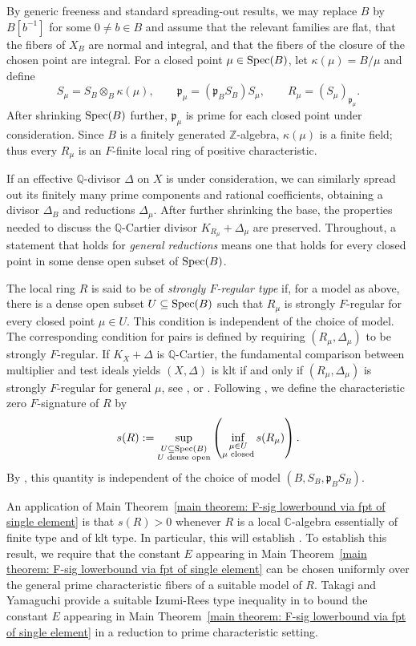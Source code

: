\documentclass[12pt]{amsart}
\numberwithin{equation}{theorem}
\theoremstyle{plain}
\newcommand{\QQ}{\mathbb{Q}}
\newcommand{\CC}{\mathbb{C}}
\begin{document}
By generic freeness and standard spreading-out results, we may replace $B$ by $B[b^{-1}]$ for some $0\ne b\in B$ and assume that the relevant families are flat, that the fibers of $X_B$ are normal and integral, and that the fibers of the closure of the chosen point are integral. For a closed point $\mu\in\operatorname{{Spec}}(B)$, let $\kappa(\mu)=B/\mu$ and define
\[
  S_\mu=S_B\otimes_B\kappa(\mu),\qquad
  \mathfrak p_\mu=(\mathfrak p_BS_B)S_\mu,\qquad
  R_\mu=(S_\mu)_{\mathfrak p_\mu}.
\]
After shrinking $\operatorname{{Spec}}(B)$ further, $\mathfrak p_\mu$ is prime for each closed point under consideration.  Since $B$ is a finitely generated $\mathbb Z$-algebra, $\kappa(\mu)$ is a finite field; thus every $R_\mu$ is an $F$-finite local ring of positive characteristic.  

If an effective $\QQ$-divisor $\Delta$ on $X$ is under consideration, we can similarly spread out its finitely many prime components and rational coefficients, obtaining a divisor $\Delta_B$ and reductions $\Delta_\mu$.  After further shrinking the base, the properties needed to discuss the $\mathbb Q$-Cartier divisor $K_{R_\mu}+\Delta_\mu$ are preserved.  Throughout, a statement that holds for \emph{general reductions} means one that holds for every closed point in some dense open subset of $\operatorname{{Spec}}(B)$.


The local ring $R$ is said to be of \emph{strongly $F$-regular type}
if, for a model as above, there is a dense open subset
$U\subseteq\operatorname{{Spec}}(B)$ such that $R_\mu$ is strongly $F$-regular for every closed point $\mu\in U$.  This condition is independent of the choice of model.  The corresponding condition for pairs is defined by requiring $(R_\mu,\Delta_\mu)$ to be strongly $F$-regular.  If $K_X+\Delta$ is $\mathbb Q$-Cartier, the fundamental comparison between multiplier and test ideals yields $(X,\Delta)$ is klt if and only if $(R_\mu,\Delta_\mu)$ is strongly $F$-regular for general $\mu$, see \cite{HaraWatanabe2002,Takagi2004}, or \cite[Theorem~2.11]{TY26}.  Following \cite[Definition~4.1]{TY26}, we define the characteristic zero $F$-signature of $R$ by
\[
    s(R)
    := \sup_{\substack{U\subseteq\operatorname{{Spec}}(B)\\U\text{ dense open}}} \left(\inf_{\substack{\mu\in U\\\mu\text{ closed}}}s(R_\mu)\right).
\]
By \cite[Proposition~4.2]{TY26}, this quantity is independent of the choice of model $(B,S_B,\mathfrak p_BS_B)$.

An application of Main Theorem~\ref{main theorem: F-sig lowerbound via fpt of single element} is that $s(R)>0$ whenever $R$ is a local $\CC$-algebra essentially of finite type and of klt type. In particular, this will establish
\cite[Conjecture~A]{TY26}. To establish this result, we require that the constant $E$ appearing in Main Theorem~\ref{main theorem: F-sig lowerbound via fpt of single element} can be chosen uniformly over the general prime characteristic fibers of a suitable model of $R$. Takagi and Yamaguchi provide a suitable Izumi-Rees type inequality in \cite[Lemma~4.14]{TY26} to bound the constant $E$ appearing in Main Theorem~\ref{main theorem: F-sig lowerbound via fpt of single element} in a reduction to prime characteristic setting.
\end{document}
